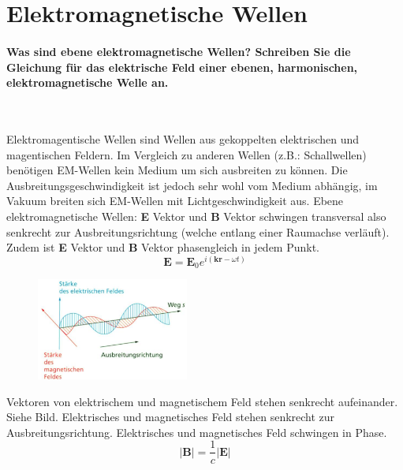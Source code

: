 \documentclass[a4paper, 11pt, ngerman, parskip=half]{scrartcl}
\begin{document}
\newpage

\section{Elektromagnetische Wellen}

\paragraph{Was sind ebene elektromagnetische Wellen? Schreiben Sie die Gleichung für das elektrische
Feld einer ebenen, harmonischen, elektromagnetische Welle an.} ~

Elektromagentische Wellen sind Wellen aus gekoppelten elektrischen und magentischen Feldern. Im Vergleich zu anderen Wellen (z.B.: Schallwellen) benötigen
EM-Wellen kein Medium um sich ausbreiten zu können. Die Ausbreitungsgeschwindigkeit ist jedoch sehr wohl vom Medium abhängig, im Vakuum breiten sich EM-Wellen mit Lichtgeschwindigkeit aus.
Ebene elektromagnetische Wellen: \textbf{E} Vektor und \textbf{B} Vektor schwingen transversal also senkrecht zur Ausbreitungsrichtung (welche entlang einer Raumachse verläuft).
Zudem ist \textbf{E} Vektor und \textbf{B} Vektor phasengleich in jedem Punkt. 
\begin{equation}
    \textbf{E} = \textbf{E}_0 e^{i(\textbf{kr} - \omega t)}
\end{equation}

\begin{figure}[H]
    \centering
    \includegraphics[width=5cm]{image/13/1.png}
\end{figure}

Vektoren von elektrischem und magnetischem Feld stehen senkrecht aufeinander. Siehe Bild.
Elektrisches und magnetisches Feld stehen senkrecht zur Ausbreitungsrichtung. Elektrisches und
magnetisches Feld schwingen in Phase.
\begin{equation}
|\textbf{B}| = \frac{1}{c} |\textbf{E}|
\end{equation}
\end{document}
